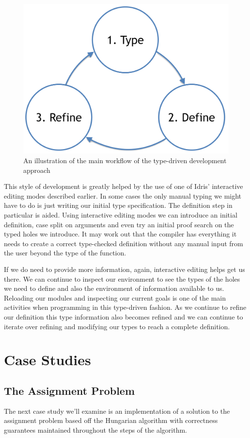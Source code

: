 \documentclass[a4paper, notitlepage]{report}
\begin{document}
\begin{figure}[H]
\centering
\includegraphics[width=0.8\linewidth]{./fig/tdd_cycle.png}
\caption{An illustration of the main workflow of the type-driven development approach}
\end{figure}

This style of development is greatly helped by the use of one of Idris'
interactive editing modes described earlier. In some cases the only manual
typing we might have to do is just writing our initial type specification. The
definition step in particular is aided. Using interactive editing modes we can
introduce an initial definition, case split on arguments and even try an initial
proof search on the typed holes we introduce. It may work out that the compiler
has everything it needs to create a correct type-checked definition without any
manual input from the user beyond the type of the function.

If we do need to provide more information, again, interactive editing helps get
us there. We can continue to inspect our environment to see the types of the
holes we need to define and also the environment of information available to us.
Reloading our modules and inspecting our current goals is one of the main
activities when programming in this type-driven fashion. As we continue to
refine our definition this type information also becomes refined and we can
continue to iterate over refining and modifying our types to reach a complete
definition.
\chapter{Case Studies}
\label{sec:org7e50571}
\section{The Assignment Problem}
\label{sec:orgb7b3929}
The next case study we'll examine is an implementation of a solution to the
assignment problem based off the Hungarian algorithm with correctness guarantees
maintained throughout the steps of the algorithm.
\end{document}
